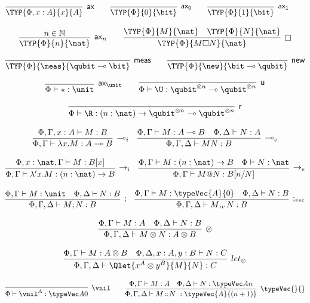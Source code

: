 \begin{table}
    \small
    \[
        \infer[\mathsf{ax}]{\TYP{\Phi, x:A}{x}{A}}{} \qquad
        \infer[\mathsf{ax_0}]{\TYP{\Phi}{0}{\bit}}{} \qquad
        \infer[\mathsf{ax_1}]{\TYP{\Phi}{1}{\bit}}{} \qquad
    \]
    
    \[
        \infer[\mathsf{ax}_n]{\TYP{\Phi}{n}{\nat}}{n\in\mathbb{N}} \qquad
        \infer[\square]{\TYP{\Phi}{M\square N}{\nat}}
        {\TYP{\Phi}{M}{\nat} & \TYP{\Phi}{N}{\nat}}
    \]
    
    \[
        \infer[\mathsf{meas}]{\TYP{\Phi}{\meas}{\qubit\multimap\bit}}{} \qquad
        \infer[\mathsf{new}]{\TYP{\Phi}{\new}{\bit\multimap\qubit}}{}
    \]
    
    \[
        \infer[\mathsf{ax_{\unit}}]{\Phi\vdash \star: \unit}{}\qquad
        \infer[\mathsf{u}]{\Phi\vdash \U:\qubit^{\otimes n}\multimap\qubit^{\otimes n}}{}
    \]
    
    \[
        \infer[\mathsf{r}]{\Phi\vdash \R:(n:\nat)\to\qubit^{\otimes n}\multimap\qubit^{\otimes n}}{}
    \]
    
    \[
        \infer[\multimap_i]{\Phi,\Gamma\vdash\lambda x.M:A\multimap B}{\Phi,\Gamma,x:A\vdash M:B}
        \quad
        \infer[\multimap_e]{\Phi,\Gamma,\Delta\vdash MN:B}{\Phi,\Gamma\vdash M:A\multimap B & \Phi,\Delta\vdash N:A}
    \]
    
    \[
        \infer[\rightarrow_i]{\Phi,\Gamma\vdash\lambda' x.M:(n:\nat)\to B}{\Phi,x:\nat,\Gamma\vdash M:B[x]}
        \quad
        \infer[\rightarrow_e]{\Phi,\Gamma\vdash M @ N:B[n/N]}{\Phi,\Gamma\vdash M:(n:\nat)\to B & \Phi\vdash N:\nat}
    \]
    
    \[
        \infer[;]{\Phi,\Gamma,\Delta\vdash M;N :B}{\Phi,\Gamma\vdash M:\unit & \Phi,\Delta\vdash N:B}
        \quad
        \infer[;_{vec}]{\Phi,\Gamma,\Delta\vdash M;_vN :B}{\Phi,\Gamma\vdash M:\typeVec{A}{0} & \Phi,\Delta\vdash N:B}
    \]
    
    \[
        \infer[\otimes]{\Phi,\Gamma,\Delta\vdash M\otimes N:A \otimes B}{\Phi,\Gamma\vdash M:A & \Phi,\Delta\vdash N:B}
    \]
    
    \[
        \infer[let_\otimes]{\Phi,\Gamma,\Delta\vdash \Qlet{x^A \otimes y^B}{M}{N}:C}{\Phi,\Gamma\vdash M:A\otimes B & \Phi,\Delta,x:A,y:B\vdash N: C}
    \]
    
    \[
        \infer[\vnil]{\Phi\vdash \vnil^A:\typeVec A 0}{}
        \qquad
        \infer[\typeVec{}{}]{\Phi,\Gamma,\Delta\vdash M\!::\!N\ :\typeVec{A}{(n+1)}}{\Phi,\Gamma\vdash M:A & \Phi,\Delta\vdash N: \typeVec A n}
    \]
    

\end{table}
